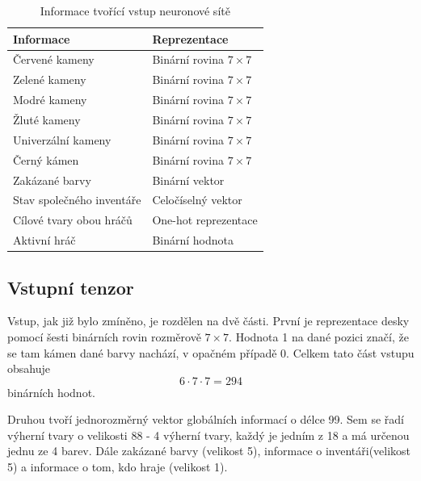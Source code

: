\begin{table}[H]
\centering
\caption{Informace tvořící vstup neuronové sítě}
\label{tab:input_encoding}

\begin{tabular}{p{5cm}p{8cm}}
\toprule
\textbf{Informace} & \textbf{Reprezentace} \\
\midrule
Červené kameny & Binární rovina $7 \times 7$ \\

Zelené kameny & Binární rovina $7 \times 7$ \\

Modré kameny & Binární rovina $7 \times 7$ \\

Žluté kameny & Binární rovina $7 \times 7$ \\

Univerzální kameny & Binární rovina $7 \times 7$ \\

Černý kámen & Binární rovina $7 \times 7$ \\

Zakázané barvy & Binární vektor \\

Stav společného inventáře & Celočíselný vektor \\

Cílové tvary obou hráčů & One-hot reprezentace \\

Aktivní hráč & Binární hodnota \\
\bottomrule
\end{tabular}
\end{table}

\subsection{Vstupní tenzor}

Vstup, jak již bylo zmíněno, je rozdělen na dvě části. První je reprezentace desky pomocí šesti binárních rovin rozměrově $7 \times 7$. Hodnota 1 
na dané pozici značí, že se tam kámen dané barvy nachází, v opačném případě 0. Celkem tato část vstupu obsahuje
\[
6 \cdot 7 \cdot 7 = 294
\]
binárních hodnot.

Druhou tvoří jednorozměrný vektor globálních informací o délce 99. Sem se řadí výherní tvary o velikosti 88 - 4 výherní tvary, každý je jedním z 18 a má
určenou jednu ze 4 barev. Dále zakázané barvy (velikost 5), informace o inventáři(velikost 5) a informace o tom, kdo hraje (velikost 1). 



